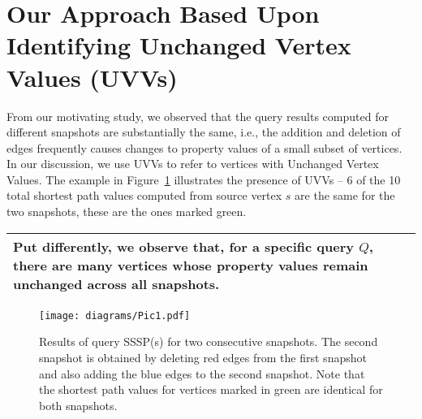 



\section{Our Approach Based Upon Identifying Unchanged Vertex Values (UVVs)}

From our motivating study, we observed that the query results computed for different snapshots are substantially the same, i.e., the addition and deletion of edges frequently causes changes to property values of a small subset of vertices. In our discussion, we use UVVs to refer to vertices with Unchanged Vertex Values. The example in Figure~\ref{alg1} illustrates the presence of UVVs -- 6 of the 10 total shortest path values computed from source vertex $s$ are the same for the two snapshots, these are the ones marked green. %

\vspace{0.125in}
\begin{tabular} {|p{7.5cm}|} \hline
\textsf{Put differently, we observe that, for a specific query $Q$, there are many vertices whose property values remain unchanged across all snapshots.} \\ \hline
\end{tabular}
\vspace{0.15in}

\begin{figure}[!t]
    \centering
    \texttt{[image: diagrams/Pic1.pdf]}
    \vspace{-0.1in}
    \caption{Results of query SSSP(s) for two consecutive snapshots. The second snapshot is obtained by deleting red edges from the first snapshot and also adding the blue edges to the second snapshot. Note that the shortest path values for vertices marked in green are identical for both snapshots.}
    \label{alg1}
    \vspace{-0.175in}
\end{figure}

